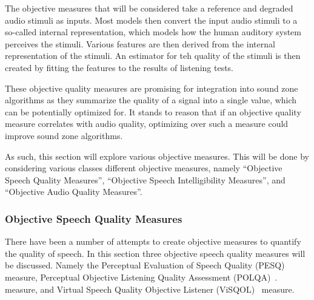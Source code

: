 The objective measures that will be considered take a reference and degraded audio stimuli as inputs.
Most models then convert the input audio stimuli to a so-called internal representation, which models how the 
human auditory system perceives the stimuli.
Various features are then derived from the internal representation of the stimuli.
An estimator for teh quality of the stimuli is then created by fitting the features to the results of listening tests.

These objective quality measures are promising for integration into sound zone algorithms as they summarize the 
quality of a signal into a single value, which can be potentially optimized for. 
It stands to reason that if an objective quality measure correlates with audio quality, optimizing over such a measure
could improve sound zone algorithms.

As such, this section will explore various objective measures.
This will be done by considering various classes different objective measures, namely ``Objective Speech Quality Measures'',
``Objective Speech Intelligibility Measures'', and ``Objective Audio Quality Measures''. 

\subsubsection{Objective Speech Quality Measures}
There have been a number of attempts to create objective measures to quantify the quality of speech.
In this section three objective speech quality measures will be discussed.
Namely the Perceptual Evaluation of Speech Quality (PESQ)~\cite{rix2001perceptual} measure,
Perceptual Objective Listening Quality Assessment (POLQA)~\cite{beerends2013perceptual}. measure, and 
Virtual Speech Quality Objective Listener (ViSQOL)~\cite{hines2012visqol,chinen2020visqol} measure.

